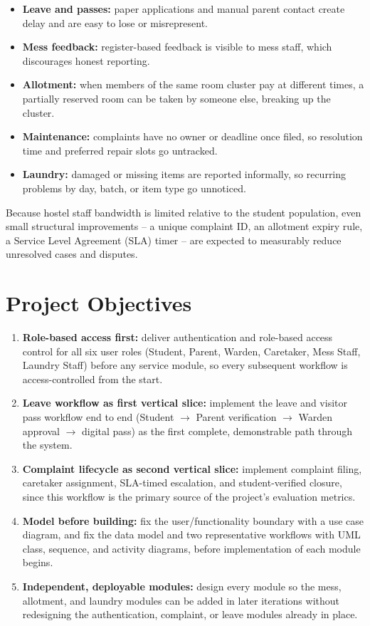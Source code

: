 \documentclass{tietreport}
\begin{document}
\begin{itemize}
  \item \textbf{Leave and passes:} paper applications and manual parent
    contact create delay and are easy to lose or misrepresent.
  \item \textbf{Mess feedback:} register-based feedback is visible to mess
    staff, which discourages honest reporting.
  \item \textbf{Allotment:} when members of the same room cluster pay at
    different times, a partially reserved room can be taken by someone
    else, breaking up the cluster.
  \item \textbf{Maintenance:} complaints have no owner or deadline once
    filed, so resolution time and preferred repair slots go untracked.
  \item \textbf{Laundry:} damaged or missing items are reported informally,
    so recurring problems by day, batch, or item type go unnoticed.
\end{itemize}

Because hostel staff bandwidth is limited relative to the student
population, even small structural improvements -- a unique complaint ID,
an allotment expiry rule, a Service Level Agreement (SLA) timer -- are
expected to measurably reduce unresolved cases and disputes.

\section{Project Objectives}

\begin{enumerate}
  \item \textbf{Role-based access first:} deliver authentication and
    role-based access control for all six user roles (Student, Parent,
    Warden, Caretaker, Mess Staff, Laundry Staff) before any service
    module, so every subsequent workflow is access-controlled from the
    start.
  \item \textbf{Leave workflow as first vertical slice:} implement the
    leave and visitor pass workflow end to end (Student
    $\rightarrow$ Parent verification $\rightarrow$ Warden approval
    $\rightarrow$ digital pass) as the first complete, demonstrable path
    through the system.
  \item \textbf{Complaint lifecycle as second vertical slice:} implement
    complaint filing, caretaker assignment, SLA-timed escalation, and
    student-verified closure, since this workflow is the primary source
    of the project's evaluation metrics.
  \item \textbf{Model before building:} fix the user/functionality
    boundary with a use case diagram, and fix the data model and two
    representative workflows with UML class, sequence, and activity
    diagrams, before implementation of each module begins.
  \item \textbf{Independent, deployable modules:} design every module so
    the mess, allotment, and laundry modules can be added in later
    iterations without redesigning the authentication, complaint, or
    leave modules already in place.
\end{enumerate}
\end{document}
